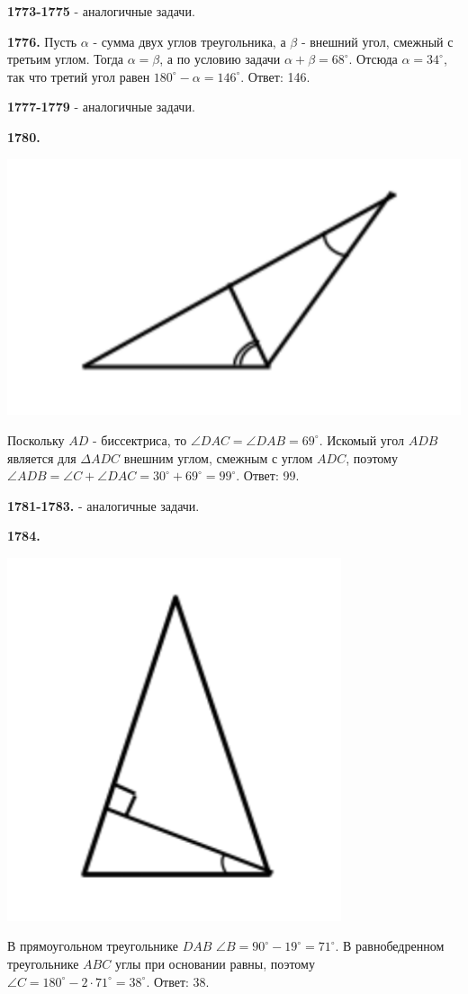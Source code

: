 \textbf{1773-1775} - аналогичные задачи.

\textbf{1776.} Пусть $\alpha$ - сумма двух углов треугольника, а $\beta$ - внешний угол, смежный с третьим углом. Тогда $\alpha = \beta$, а по условию задачи $\alpha + \beta = 68^\circ$. Отсюда $\alpha = 34^\circ$, так что  третий угол равен $180^\circ - \alpha = 146^\circ$. \newline \null \hspace*{\fill} Ответ: 146.
 
\textbf{1777-1779} - аналогичные задачи.

\textbf{1780.}

{\centering \includegraphics[width=0.5\linewidth]{Geometry/Content/7.png}
	
}

Поскольку $AD$ - биссектриса, то $\angle DAC = \angle DAB = 69^\circ$. Искомый угол $ADB$ является для $\Delta ADC$ внешним углом, смежным с углом $ADC$, поэтому $\angle ADB = \angle C + \angle DAC = 30^\circ + 69^\circ = 99^\circ.$ \newline \null \hspace*{\fill} Ответ: 99.

\textbf{1781-1783.} - аналогичные задачи.

\clearpage 

\textbf{1784.}

{\centering \includegraphics[width=0.4\linewidth]{Geometry/Content/8.png}
	
}

В прямоугольном треугольнике $DAB$ $\angle B = 90^\circ - 19^\circ = 71^\circ$. В равнобедренном треугольнике $ABC$ углы при основании равны, поэтому $\angle C = 180^\circ - 2\cdot 71^\circ = 38^\circ.$ \newline \null \hspace*{\fill} Ответ: 38.

